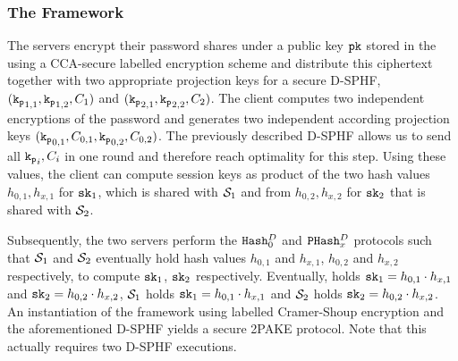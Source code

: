 \subsubsection{The Framework}
The servers encrypt their password shares under a public key $\mathtt{pk}$ stored in the \crs using a \ac{CCA}-secure labelled encryption scheme and distribute this ciphertext together with two appropriate projection keys for a secure \ac{D-SPHF}, $(\mathtt{k_p}_{1,1},\mathtt{k_p}_{1,2},C_1)$ and $(\mathtt{k_p}_{2,1},\mathtt{k_p}_{2,2},C_2)$.
The client computes two independent encryptions of the password and generates two independent according projection keys $(\mathtt{k_p}_{0,1},C_{0,1},\mathtt{k_p}_{0,2},C_{0,2})$.
The previously described \ac{D-SPHF} allows us to send all $\mathtt{k_p}_i,C_i$ in one round and therefore reach optimality for this step.
Using these values, the client can compute session keys as product of the two hash values $h_{0,1},h_{x,1}$ for $\mathtt{sk}_1$, which is shared with $\mathcal{S}_1$ and from $h_{0,2},h_{x,2}$ for $\mathtt{sk}_2$ that is shared with $\mathcal{S}_2$.

Subsequently, the two servers perform the $\mathtt{Hash}_0^D$ and $\mathtt{PHash}_x^D$ protocols such that $\mathcal{S}_1$ and $\mathcal{S}_2$ eventually hold hash values $h_{0,1}$ and $h_{x,1}$, $h_{0,2}$ and $h_{x,2}$ respectively, to compute $\mathtt{sk}_1$, $\mathtt{sk}_2$ respectively.
Eventually, \Client holds $\mathtt{sk}_1=h_{0,1}\cdot h_{x,1}$ and $\mathtt{sk}_2=h_{0,2}\cdot h_{x,2}$, $\mathcal{S}_1$ holds $\mathtt{sk}_1=h_{0,1}\cdot h_{x,1}$ and $\mathcal{S}_2$ holds $\mathtt{sk}_2=h_{0,2}\cdot h_{x,2}$.
An instantiation of the framework using labelled Cramer-Shoup encryption and the aforementioned \ac{D-SPHF} yields a secure \ac{2PAKE} protocol.
Note that this actually requires two \ac{D-SPHF} executions.


